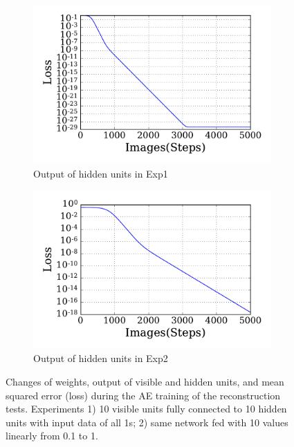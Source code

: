 \begin{figure}
\begin{subfigure}[t]{0.48\textwidth}
		\DIFaddendFL \includegraphics[width=\textwidth]{pics_sdlm/20_exp_AE/exp1_loss.pdf}
		\caption{Output of hidden units in Exp1}
	\end{subfigure}
	\DIFdelbeginFL %
\DIFdelendFL \DIFaddbeginFL \begin{subfigure}[t]{0.48\textwidth}
		\DIFaddendFL \includegraphics[width=\textwidth]{pics_sdlm/20_exp_AE/exp2_loss.pdf}
		\caption{Output of hidden units in Exp2}
	\end{subfigure}
	\caption{Changes of weights, output of visible and hidden units, and mean squared error (loss) during the AE training of the reconstruction tests. 
		Experiments 1) 10 visible units fully connected to 10 hidden units with input data of all 1s; 2) \DIFaddbeginFL {}\DIFaddendFL same network fed with 10 values \DIFdelbeginFL {}\DIFdelendFL \DIFaddbeginFL {}\DIFaddendFL linearly from 0.1 to 1.}
	\label{fig:ae_orig}
\end{figure}

